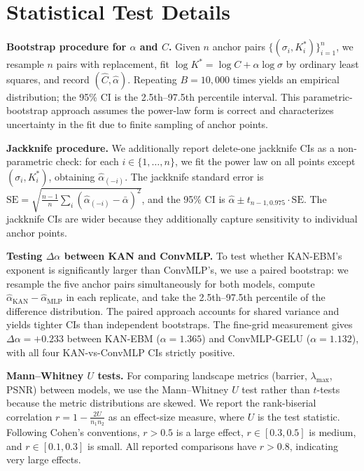 \documentclass{article}
\begin{document}
\section{Statistical Test Details}
\label{app:stats}

\textbf{Bootstrap procedure for $\alpha$ and $C$.} Given $n$ anchor pairs $\{(\sigma_i, K^*_i)\}_{i=1}^n$, we resample $n$ pairs with replacement, fit $\log K^* = \log C + \alpha \log \sigma$ by ordinary least squares, and record $(\hat C, \hat \alpha)$. Repeating $B{=}10{,}000$ times yields an empirical distribution; the 95\% CI is the 2.5th--97.5th percentile interval. This parametric-bootstrap approach assumes the power-law form is correct and characterizes uncertainty in the fit due to finite sampling of anchor points.

\textbf{Jackknife procedure.} We additionally report delete-one jackknife CIs as a non-parametric check: for each $i \in \{1,\dots,n\}$, we fit the power law on all points except $(\sigma_i, K^*_i)$, obtaining $\hat\alpha_{(-i)}$. The jackknife standard error is $\mathrm{SE} = \sqrt{\frac{n-1}{n} \sum_i (\hat\alpha_{(-i)} - \bar\alpha)^2}$, and the 95\% CI is $\hat\alpha \pm t_{n-1, 0.975} \cdot \mathrm{SE}$. The jackknife CIs are wider because they additionally capture sensitivity to individual anchor points.

\textbf{Testing $\Delta\alpha$ between KAN and ConvMLP.} To test whether KAN-EBM's exponent is significantly larger than ConvMLP's, we use a paired bootstrap: we resample the five anchor pairs simultaneously for both models, compute $\hat\alpha_{\mathrm{KAN}} - \hat\alpha_{\mathrm{MLP}}$ in each replicate, and take the 2.5th--97.5th percentile of the difference distribution. The paired approach accounts for shared variance and yields tighter CIs than independent bootstraps. The fine-grid measurement gives $\Delta\alpha{=}+0.233$ between KAN-EBM ($\alpha{=}1.365$) and ConvMLP-GELU ($\alpha{=}1.132$), with all four KAN-vs-ConvMLP CIs strictly positive.

\textbf{Mann--Whitney $U$ tests.} For comparing landscape metrics (barrier, $\lambda_{\max}$, PSNR) between models, we use the Mann--Whitney $U$ test rather than $t$-tests because the metric distributions are skewed. We report the rank-biserial correlation $r = 1 - \frac{2U}{n_1 n_2}$ as an effect-size measure, where $U$ is the test statistic. Following Cohen's conventions, $r > 0.5$ is a large effect, $r \in [0.3, 0.5]$ is medium, and $r \in [0.1, 0.3]$ is small. All reported comparisons have $r > 0.8$, indicating very large effects.
\end{document}
